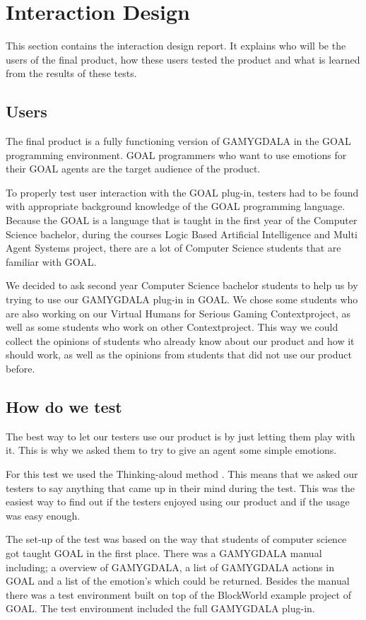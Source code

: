 \documentclass[12pt,a4paper]{article}
\begin{document}
\section{Interaction Design}
This section contains the interaction design report. It explains who will be the users of the final product, how these users tested the product and what is learned from the results of these tests.

\subsection{Users}
The final product is a fully functioning version of GAMYGDALA in the GOAL programming environment. GOAL programmers who want to use emotions for their GOAL agents are the target audience of the product.

To properly test user interaction with the GOAL plug-in, testers had to be found with appropriate background knowledge of the GOAL programming language. Because the GOAL is a language that is taught in the first year of the Computer Science bachelor, during the courses Logic Based Artificial Intelligence and Multi Agent Systems project, there are a lot of Computer Science students that are familiar with GOAL.

We decided to ask second year Computer Science bachelor students to help us by trying to use our GAMYGDALA plug-in in GOAL. We chose some students who are also working on our Virtual Humans for Serious Gaming Contextproject, as well as some students who work on other Contextproject. This way we could collect the opinions of students who already know about our product and how it should work, as well as the opinions from students that did not use our product before.

\subsection{How do we test}
The best way to let our testers use our product is by just letting them play with it. This is why we asked them to try to give an agent some simple emotions. \par
For this test we used the Thinking-aloud method \citep{thinking-aloud}. This means that we asked our testers to say anything that came up in their mind during the test. This was the easiest way to find out if the testers enjoyed using our product and if the usage was easy enough.\par
The set-up of the test was based on the way that students of computer science got taught GOAL in the first place. There was a GAMYGDALA manual including; a overview of GAMYGDALA, a list of GAMYGDALA actions in GOAL and a list of the emotion's which could be returned. Besides the manual there was a test environment built on top of the BlockWorld example project of GOAL. The test environment included the full GAMYGDALA plug-in.
\end{document}
